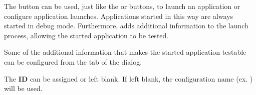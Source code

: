 The  button can be used, just like the  or 
 buttons, to launch an application or configure application 
launches. Applications started in this way are always started in debug mode.
Furthermore,  adds additional information to the 
launch process, allowing the started application to be tested.

Some of the additional information that makes the started application testable 
can be configured from the  tab of the 
 dialog.

The \textbf{\gdaut{} ID} can be assigned or left blank. If left blank, the
configuration name (ex. ) will be used.
